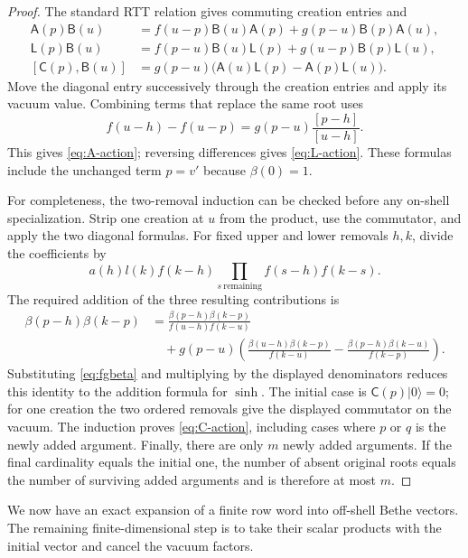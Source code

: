 \begin{proof}
The standard RTT relation gives commuting creation entries and
\begin{align*}
 \mathsf A(p)\mathsf B(u)
  &=f(u-p)\mathsf B(u)\mathsf A(p)
        +g(p-u)\mathsf B(p)\mathsf A(u),\\
 \mathsf L(p)\mathsf B(u)
  &=f(p-u)\mathsf B(u)\mathsf L(p)
        +g(u-p)\mathsf B(p)\mathsf L(u),\\
 [\mathsf C(p),\mathsf B(u)]
  &=g(p-u)\bigl(\mathsf A(u)\mathsf L(p)
                    -\mathsf A(p)\mathsf L(u)\bigr).
\end{align*}
Move the diagonal entry successively through the creation entries and
apply its vacuum value.  Combining terms that replace the same root
uses
\[
 f(u-h)-f(u-p)=g(p-u)\frac{[p-h]}{[u-h]}.
\]
This gives \eqref{eq:A-action}; reversing differences gives
\eqref{eq:L-action}.  These formulas include the unchanged term $p=v'$
because $\beta(0)=1$.

For completeness, the two-removal induction can be checked before any
on-shell specialization.  Strip one creation at $u$ from the product,
use the commutator, and apply the two diagonal formulas.  For fixed
upper and lower removals $h,k$, divide the coefficients by
\[
 a(h)l(k)f(k-h)\prod_{s\ {\mathrm{remaining}}}f(s-h)f(k-s).
\]
The required addition of the three resulting contributions is
\begin{align*}
 \beta(p-h)\beta(k-p)
 &=\frac{\beta(p-h)\beta(k-p)}{f(u-h)f(k-u)}\\
 &\quad+g(p-u)\left(
       \frac{\beta(u-h)\beta(k-p)}{f(k-u)}
       -\frac{\beta(p-h)\beta(k-u)}{f(k-p)}\right).
\end{align*}
Substituting \eqref{eq:fgbeta} and multiplying by the displayed
denominators reduces this identity to the addition formula for
$\sinh$.  The initial case is $\mathsf C(p)|0\rangle=0$; for one
creation the two ordered removals give the displayed commutator on the
vacuum.  The induction proves \eqref{eq:C-action}, including cases
where $p$ or $q$ is the newly added argument.  Finally, there are only
$m$ newly added arguments.  If the final cardinality equals the initial
one, the number of absent original roots equals the number of
surviving added arguments and is therefore at most $m$.
\end{proof}

We now have an exact expansion of a finite row word into off-shell
Bethe vectors.  The remaining finite-dimensional step is to take their
scalar products with the initial vector and cancel the vacuum factors.

